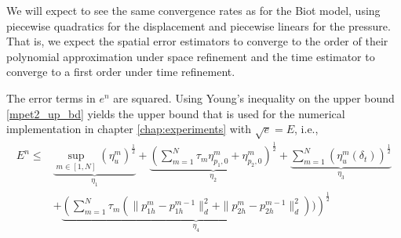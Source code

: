 \begin{remark}
We will expect to see the same convergence rates as for the Biot model, using piecewise quadratics for the displacement and piecewise linears for the pressure. That is, we expect the spatial error estimators to converge to the order of their polynomial approximation under space refinement and the time estimator to converge to a first order under time refinement. 
\end{remark}
\begin{remark}
The error terms in $e^n$ are squared. Using Young's inequality on the upper bound \eqref{mpet2_up_bd} yields the upper bound that is used for the numerical implementation in chapter \ref{chap:experiments} with $\sqrt{e}=E$, i.e.,
\begin{align*}
E^n \leq & \underbrace{\sup_{m \in [1,N]} (\eta^m_u)^\frac{1}{2}}_{\eta_1} + \underbrace{\left(\sum_{m=1}^N \tau_m \eta^m_{p_1,0} + \eta^m_{p_2,0}\right)^\frac{1}{2}}_{\eta_2} + \underbrace{\sum_{m=1}^N (\eta^m_u(\delta_t))^\frac{1}{2}}_{\eta_3} \\
& + \underbrace{\left(\sum_{m=1}^N \tau_m (\|p^m_{1h} - p^{m-1}_{1h}\|_d^2 + \|p^m_{2h} - p^{m-1}_{2h}\|_d^2) )\right)^\frac{1}{2}}_{\eta_4}
\end{align*}
\end{remark}



